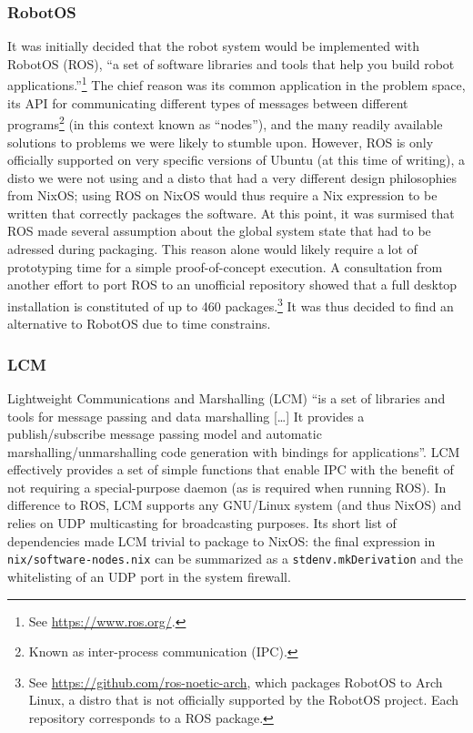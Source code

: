 
\subsubsection{RobotOS}
It was initially decided that the robot system would be implemented with RobotOS (ROS), ``a set of software libraries and tools that help you build robot applications.''\footnote{See \href{https://www.ros.org/}{https://www.ros.org/}.}
The chief reason was its common application in the problem space, its API for communicating different types of messages between different programs\footnote{Known as inter-process communication (IPC).} (in this context known as ``nodes''), and the many readily available solutions to problems we were likely to stumble upon.
However, ROS is only officially supported on very specific versions of Ubuntu (at this time of writing), a disto we were not using and a disto that had a very different design philosophies from NixOS;
using ROS on NixOS would thus require a Nix expression to be written that correctly packages the software.
At this point, it was surmised that ROS made several assumption about the global system state that had to be adressed during packaging.
This reason alone would likely require a lot of prototyping time for a simple proof-of-concept execution.
A consultation from another effort to port ROS to an unofficial repository showed that a full desktop installation is constituted of up to 460 packages.\footnote{See \href{https://github.com/ros-noetic-arch}{https://github.com/ros-noetic-arch}, which packages RobotOS to Arch Linux, a distro that is not officially supported by the RobotOS project. Each repository corresponds to a ROS package.}
It was thus decided to find an alternative to RobotOS due to time constrains.

\subsubsection{LCM}
Lightweight Communications and Marshalling (LCM) ``is a set of libraries and tools for message passing and data marshalling [\ldots] It provides a publish/subscribe message passing model and automatic marshalling/unmarshalling code generation with bindings for applications''.
LCM effectively provides a set of simple functions that enable IPC with the benefit of not requiring a special-purpose daemon (as is required when running ROS).
In difference to ROS, LCM supports any GNU/Linux system (and thus NixOS) and relies on UDP multicasting for broadcasting purposes.
Its short list of dependencies made LCM trivial to package to NixOS: the final expression in \texttt{nix/software-nodes.nix} can be summarized as a \texttt{stdenv.mkDerivation} and the whitelisting of an UDP port in the system firewall.


